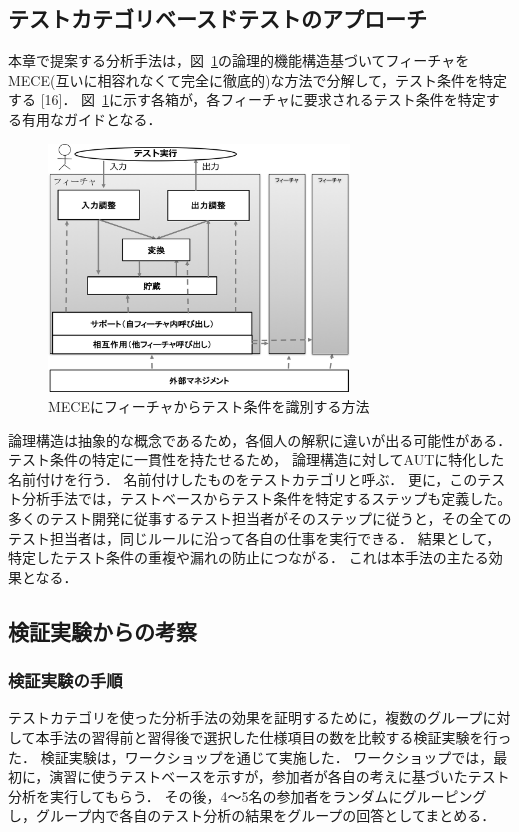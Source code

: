 \documentclass[10pt,a4j]{jarticle}
\begin{document}
\subsection{テストカテゴリベースドテストのアプローチ} \label{sec:3-1}
本章で提案する分析手法は，図~\ref{fig:D-3-Fig3}の論理的機能構造基づいてフィーチャをMECE(互いに相容れなくて完全に徹底的)な方法で分解して，テスト条件を特定する [16]．
図~\ref{fig:D-3-Fig3}に示す各箱が，各フィーチャに要求されるテスト条件を特定する有用なガイドとなる．

\begin{figure}[h]
  \begin{center}
  \includegraphics[width=8cm]{./image/D-3-Fig3.png}
  \caption{MECEにフィーチャからテスト条件を識別する方法}
  \label{fig:D-3-Fig3}
  \end{center}
   \end{figure}

論理構造は抽象的な概念であるため，各個人の解釈に違いが出る可能性がある．テスト条件の特定に一貫性を持たせるため， 論理構造に対してAUTに特化した名前付けを行う．
名前付けしたものをテストカテゴリと呼ぶ．
更に，このテスト分析手法では，テストベースからテスト条件を特定するステップも定義した。
多くのテスト開発に従事するテスト担当者がそのステップに従うと，その全てのテスト担当者は，同じルールに沿って各自の仕事を実行できる．
結果として，特定したテスト条件の重複や漏れの防止につながる．
これは本手法の主たる効果となる．
\subsection{検証実験からの考察}
\subsubsection{検証実験の手順}
テストカテゴリを使った分析手法の効果を証明するために，複数のグループに対して本手法の習得前と習得後で選択した仕様項目の数を比較する検証実験を行った．
検証実験は，ワークショップを通じて実施した．
ワークショップでは，最初に，演習に使うテストベースを示すが，参加者が各自の考えに基づいたテスト分析を実行してもらう．
その後，4〜5名の参加者をランダムにグルーピングし，グループ内で各自のテスト分析の結果をグループの回答としてまとめる．
\end{document}
